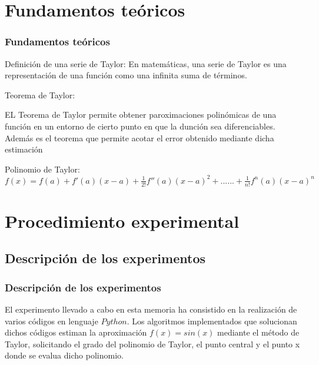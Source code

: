 \documentclass{beamer}
\begin{document}
\section{Fundamentos teóricos}
\begin{frame}

\frametitle{Fundamentos teóricos}

\begin{block}{Definición de una serie de Taylor:}
En matemáticas, una serie de Taylor es una representación de una función como una infinita suma de términos.
\end{block}
\begin{block}{Teorema de Taylor:}

EL Teorema de Taylor permite obtener paroximaciones polinómicas de una función en un entorno de cierto punto en que la dunción sea diferenciables.
Además es el teorema que permite acotar el error obtenido mediante dicha estimación
\end{block}
\begin{block}{Polinomio de Taylor:}
$f(x) = f(a) + f '(a) (x-a) + \frac{1}{2!} f '' (a) (x-a) ^ 2 + ...... + \frac{1}{n!} f ^ n(a) (x-a) ^ n$
\end{block}
	    
\end{frame}


\section{Procedimiento experimental}

\subsection{Descripción de los experimentos}
\begin{frame}
\frametitle{Descripción de los experimentos}

El experimento llevado a cabo en esta memoria ha consistido en la realización de varios códigos en lenguaje $Python$. Los algoritmos implementados que solucionan dichos códigos 
estiman la aproximación $f(x) = sin(x)$ mediante el método de Taylor, solicitando el grado del polinomio de Taylor, el punto central y el punto x donde se evalua dicho polinomio.  
  
\end{frame}
\end{document}
